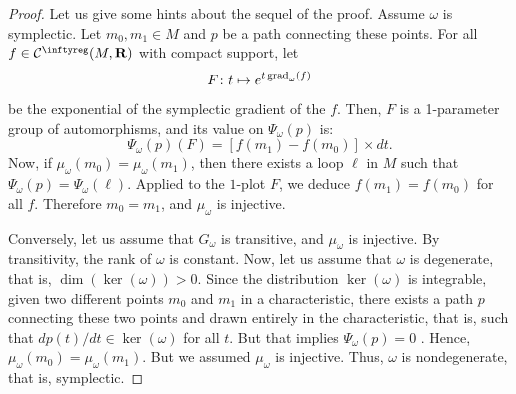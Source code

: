 \begin{proof}
  Let us give some hints about the sequel of the proof.
  Assume $\omega$ is symplectic.
  Let $m_0, m_1 \in M$ and $p$ be a path connecting these points.
  For all $f \in \Cinfty(M,\RR)$ with compact support,
  let
  $$%
    F \colon t \mapsto e^{t\grad_\omega(f)}
    $$%
  be the exponential of the symplectic gradient of the $f$.
  Then,
  $F$ is a 1-parameter group of automorphisms,
  and its value on $\Psi_\omega(p)$ is:
  $$%
    \Psi_\omega(p)(F) = [f(m_1) - f(m_0)] \times dt.
    $$%
  Now,
  if $\mu_\omega(m_0)=\mu_\omega(m_1)$,
  then there exists a loop $\ell$ in $M$ such that $\Psi_\omega(p)=\Psi_\omega(\ell)$.
  Applied to the $1$-plot $F$,
  we deduce $f(m_1) = f(m_0)$ for all $f$.
  Therefore $m_0=m_1$,
  and $\mu_\omega$ is injective.
  
  Conversely,
  let us assume that $G_\omega$ is transitive,
  and $\mu_\omega$ is injective.
  By transitivity,
  the rank of $\omega$ is constant.
  Now,
  let us assume that $\omega$ is degenerate,
  that is,
  $\dim (\ker(\omega)) > 0$.
  Since the distribution $\ker(\omega)$ is integrable,
  given two different points $m_0$ and $m_1$ in a characteristic,
  there exists a path $p$ connecting these two points and drawn entirely in the characteristic,
  that is,
  such that $dp(t)/dt \in \ker(\omega)$ for all $t$.
  But that implies $\Psi_\omega(p)=0$ \cite[\textsection\,9.20]{PIZ13}.
  Hence,
  $\mu_\omega(m_0) = \mu_\omega(m_1)$.
  But we assumed $\mu_\omega$ is injective.
  Thus,
  $\omega$ is nondegenerate,
  that is,
  symplectic.
\end{proof}

